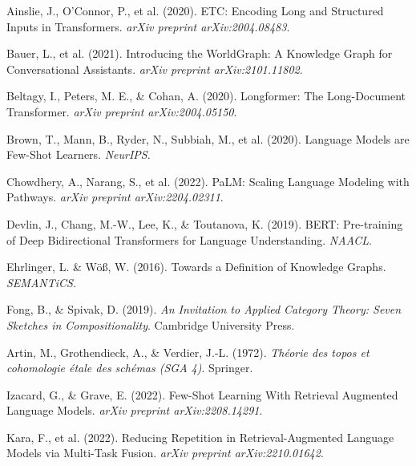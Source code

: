 \documentclass{article}
\begin{document}

\begin{thebibliography}{99}

Ainslie, J., O’Connor, P., et al. (2020).
ETC: Encoding Long and Structured Inputs in Transformers.
\emph{arXiv preprint arXiv:2004.08483}.

Bauer, L., et al. (2021).
Introducing the WorldGraph: A Knowledge Graph for Conversational Assistants.
\emph{arXiv preprint arXiv:2101.11802}.

Beltagy, I., Peters, M. E., \& Cohan, A. (2020).
Longformer: The Long-Document Transformer.
\emph{arXiv preprint arXiv:2004.05150}.

Brown, T., Mann, B., Ryder, N., Subbiah, M., et al. (2020).
Language Models are Few-Shot Learners.
\emph{NeurIPS}.

Chowdhery, A., Narang, S., et al. (2022).
PaLM: Scaling Language Modeling with Pathways.
\emph{arXiv preprint arXiv:2204.02311}.

Devlin, J., Chang, M.-W., Lee, K., \& Toutanova, K. (2019).
BERT: Pre-training of Deep Bidirectional Transformers for Language Understanding.
\emph{NAACL}.

Ehrlinger, L. \& W\"{o}{\ss}, W. (2016).
Towards a Definition of Knowledge Graphs.
\emph{SEMANTiCS}.

Fong, B., \& Spivak, D. (2019).
\emph{An Invitation to Applied Category Theory: Seven Sketches in Compositionality}.
Cambridge University Press.

Artin, M., Grothendieck, A., \& Verdier, J.-L. (1972).
\emph{Th\'{e}orie des topos et cohomologie \'etale des sch\'emas (SGA 4)}.
Springer.

Izacard, G., \& Grave, E. (2022).
Few-Shot Learning With Retrieval Augmented Language Models.
\emph{arXiv preprint arXiv:2208.14291}.

Kara, F., et al. (2022).
Reducing Repetition in Retrieval-Augmented Language Models via Multi-Task Fusion.
\emph{arXiv preprint arXiv:2210.01642}.


\end{thebibliography}
\end{document}
